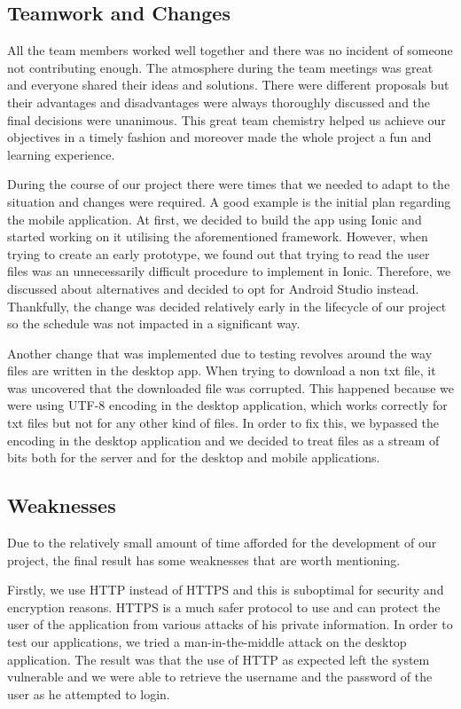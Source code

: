 \documentclass[11pt]{article}
\begin{document}
\subsection{Teamwork and Changes}

All the team members worked well together and there was no incident of someone not contributing enough. The atmosphere during the team meetings was great and everyone shared their ideas and solutions. There were different proposals but their advantages and disadvantages were always thoroughly discussed and the final decisions were unanimous. This great team chemistry helped us achieve our objectives in a timely fashion and moreover made the whole project a fun and learning experience.

During the course of our project there were times that we needed to adapt to the situation and changes were required. A good example is the initial plan regarding the mobile application. At first, we decided to build the app using Ionic \cite{ionic:19} and started working on it utilising the aforementioned framework. However, when trying to create an early prototype, we found out that trying to read the user files was an unnecessarily difficult procedure to implement in Ionic. Therefore, we discussed about alternatives and decided to opt for Android Studio instead. Thankfully, the change was decided relatively early in the lifecycle of our project so the schedule was not impacted in a significant way.

Another change that was implemented due to testing revolves around the way files are written in the desktop app. When trying to download a non txt file, it was uncovered that the downloaded file was corrupted. This happened because we were using UTF-8 encoding in the desktop application, which works correctly for txt files but not for any other kind of files. In order to fix this, we bypassed the encoding in the desktop application and we decided to treat files as a stream of bits both for the server and for the desktop and mobile applications.

\subsection{Weaknesses}

Due to the relatively small amount of time afforded for the development of our project, the final result has some weaknesses that are worth mentioning.

Firstly, we use HTTP instead of HTTPS and this is suboptimal for security and encryption reasons. HTTPS is a much safer protocol to use and can protect the user of the application from various attacks of his private information. In order to test our applications, we tried a man-in-the-middle attack \cite{callegati:09} on the desktop application. The result was that the use of HTTP as expected left the system vulnerable and we were able to retrieve the username and the password of the user as he attempted to login.  
\end{document}
